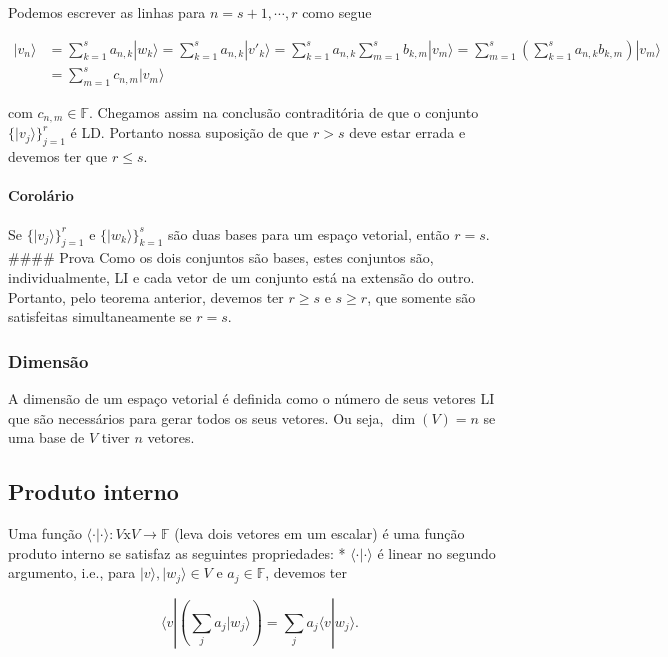 \documentclass[11pt]{article}
\begin{document}
Podemos escrever as linhas para \(n=s+1,\cdots,r\) como segue

\begin{align}
|v_{n}\rangle & = \sum_{k=1}^{s}a_{n,k}|w_{k}\rangle = \sum_{k=1}^{s}a_{n,k}|v'_{k}\rangle  = \sum_{k=1}^{s}a_{n,k}\sum_{m=1}^{s}b_{k,m}|v_{m}\rangle = \sum_{m=1}^{s}\left(\sum_{k=1}^{s}a_{n,k}b_{k,m}\right)|v_{m}\rangle \\
& = \sum_{m=1}^{s}c_{n,m}|v_{m}\rangle 
\end{align}

com \(c_{n,m}\in\mathbb{F}\). Chegamos assim na conclusão contraditória
de que o conjunto \(\{|v_{j}\rangle\}_{j=1}^{r}\) é LD. Portanto nossa
suposição de que \(r>s\) deve estar errada e devemos ter que \(r\le s\).

    \paragraph{Corolário}\label{coroluxe1rio}

Se \(\{|v_{j}\rangle\}_{j=1}^{r}\) e \(\{|w_{k}\rangle\}_{k=1}^{s}\) são
duas bases para um espaço vetorial, então \(r=s\). \#\#\#\# Prova Como
os dois conjuntos são bases, estes conjuntos são, individualmente, LI e
cada vetor de um conjunto está na extensão do outro. Portanto, pelo
teorema anterior, devemos ter \(r\ge s\) e \(s\ge r\), que somente são
satisfeitas simultaneamente se \(r=s\).

    \subsubsection{Dimensão}\label{dimensuxe3o}

A dimensão de um espaço vetorial é definida como o número de seus
vetores LI que são necessários para gerar todos os seus vetores. Ou
seja, \(\dim(V)=n\) se uma base de \(V\) tiver \(n\) vetores.

    \subsection{Produto interno}\label{produto-interno}

Uma função
\(\langle \cdot|\cdot\rangle:V\text{x}V\rightarrow\mathbb{F}\) (leva
dois vetores em um escalar) é uma função produto interno se satisfaz as
seguintes propriedades: * \(\langle\cdot|\cdot\rangle\) é linear no
segundo argumento, i.e., para \(|v\rangle,|w_{j}\rangle\in V\) e
\(a_{j}\in\mathbb{F}\), devemos ter

\begin{equation}
\langle v|\left(\sum_{j}a_{j}|w_{j}\rangle\right) = \sum_{j}a_{j}\langle v|w_{j}\rangle.
\end{equation}
\end{document}
